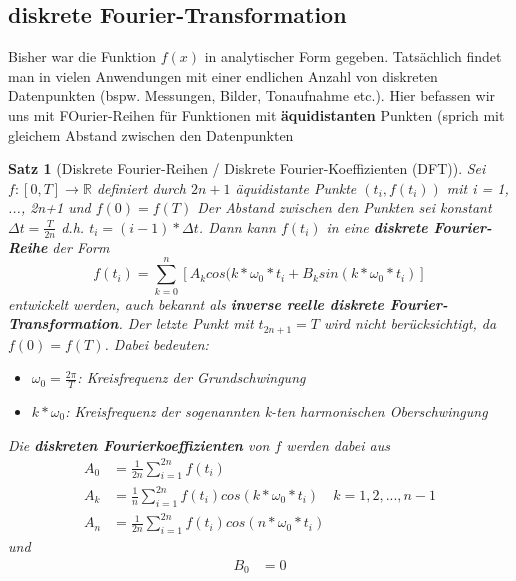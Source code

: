 \documentclass{article}
\theoremstyle{satz}
\newtheorem*{satz}{Satz}
\theoremstyle{definition}
\begin{document}
\subsection{diskrete Fourier-Transformation}
Bisher war die Funktion $f(x)$ in analytischer Form gegeben. Tatsächlich findet man in vielen Anwendungen mit einer endlichen Anzahl von diskreten Datenpunkten (bspw. Messungen, Bilder, Tonaufnahme etc.). Hier befassen wir uns mit FOurier-Reihen für Funktionen mit \textbf{äquidistanten} Punkten (sprich mit gleichem Abstand zwischen den Datenpunkten

\theoremstyle{satz}
\begin{tcolorbox}
\begin{satz}[Diskrete Fourier-Reihen / Diskrete Fourier-Koeffizienten (DFT)]
 Sei $f: [0,T] \rightarrow \mathbb{R}$ definiert durch $2n+1$ äquidistante Punkte $(t_i, f(t_i))$ mit i = 1, ..., 2n+1 und $f(0) = f(T)$ Der Abstand zwischen den Punkten sei konstant $\Delta t = \frac{T}{2n}$ d.h. $t_i = (i-1) * \Delta t$. Dann kann $f(t_i)$ in eine \textbf{diskrete Fourier-Reihe} der Form
\begin{equation}
 	f(t_i) = \sum\limits^n_{k=0} [A_k cos(k*\omega_0*t_i + B_k sin(k*\omega_0 * t_i)]
\end{equation}
entwickelt werden, auch bekannt als \textbf{inverse reelle diskrete Fourier-Transformation}. Der letzte Punkt mit $t_{2n+1} = T$ wird nicht berücksichtigt, da $f(0) = f(T)$. Dabei bedeuten:\\
\begin{itemize}
	\item[-] $\omega_0 = \frac{2 \pi}{T}$: Kreisfrequenz der Grundschwingung
	\item[-] $k * \omega_0$: Kreisfrequenz der sogenannten k-ten harmonischen Oberschwingung
\end{itemize}
Die \textbf{diskreten Fourierkoeffizienten} von $f$ werden dabei aus
\begin{equation}
\begin{split}
	A_0 &= \frac{1}{2n} \sum\limits_{i=1}^{2n} f(t_i)\\
	A_k &= \frac{1}{n} \sum\limits_{i=1}^{2n} f(t_i) cos(k * \omega_0 * t_i) \quad k=1,2,...,n-1\\
	A_n &= \frac{1}{2n} \sum\limits_{i=1}^{2n} f(t_i) cos(n * \omega_0 * t_i)
\end{split}
\end{equation}
und
\begin{equation}
\begin{split}
	B_0 &= 0 \\

\end{split}
\end{equation}
\end{satz}
\end{tcolorbox}
\end{document}
